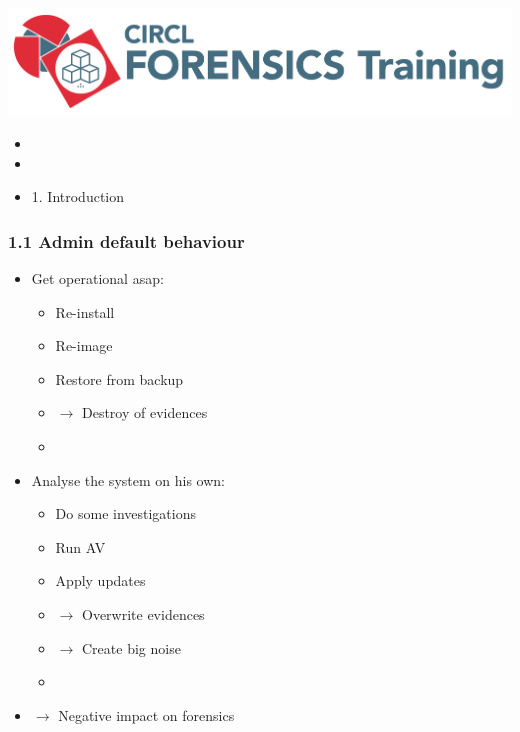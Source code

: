 %
%



\begin{frame}
    \includegraphics[scale=0.3]{images/logo-circl-Forensics.png}
    \begin{itemize}
        \item[]
        \item[]
        \item[] 1. Introduction
    \end{itemize}
\end{frame}


\begin{frame}
  \frametitle{1.1 Admin default behaviour}
  \begin{itemize}
    \item Get operational asap:
    \begin{itemize}
      \item Re-install
      \item Re-image
      \item Restore from backup
      \item[] $\to$ Destroy of evidences
      \item[]
    \end{itemize}
    \item Analyse the system on his own:
    \begin{itemize}
      \item Do some investigations
      \item Run AV
      \item Apply updates
      \item[] $\to$ Overwrite evidences
      \item[] $\to$ Create big noise
      \item[]
    \end{itemize}
    \item[] $\to$ Negative impact on forensics
  \end{itemize}
\end{frame}


